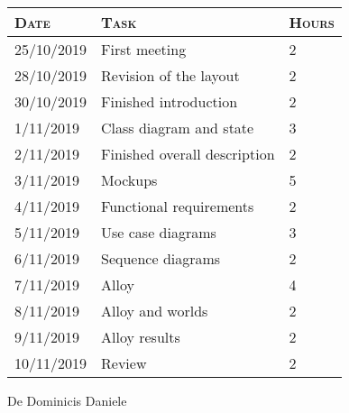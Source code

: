 {\begin{tabular}{|l|l|l|}
    \hline
    \textsc{Date} & \textsc{Task} & \textsc{Hours} \\ \hline
    25/10/2019 & First meeting & 2 \\ \hline
    28/10/2019 & Revision of the layout & 2 \\ \hline
    30/10/2019 & Finished introduction & 2 \\ \hline
    1/11/2019 & Class diagram and state & 3\\ \hline
    2/11/2019 & Finished overall description & 2\\ \hline
    3/11/2019 & Mockups & 5 \\ \hline
    4/11/2019 & Functional requirements & 2 \\ \hline
    5/11/2019 & Use case diagrams & 3 \\ \hline
    6/11/2019 & Sequence diagrams & 2 \\ \hline
    7/11/2019 & Alloy & 4 \\ \hline
    8/11/2019 & Alloy and worlds & 2 \\ \hline
    9/11/2019 & Alloy results & 2 \\ \hline
    10/11/2019 & Review & 2 \\
    \hline

\end{tabular}

De Dominicis Daniele

}
